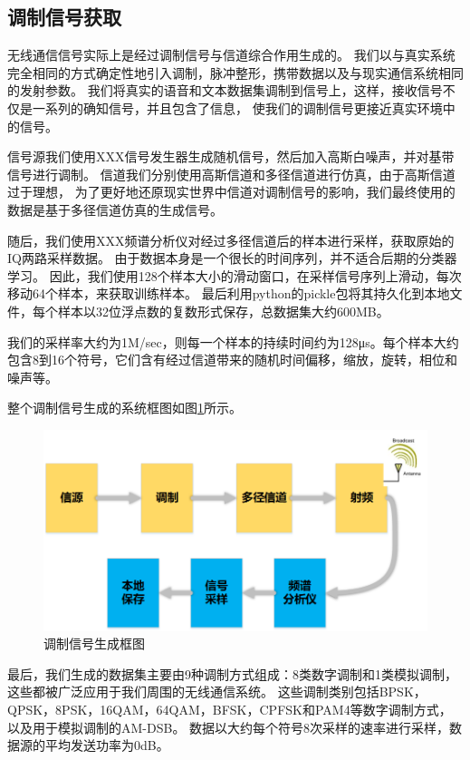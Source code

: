 \subsection{调制信号获取}

无线通信信号实际上是经过调制信号与信道综合作用生成的。
我们以与真实系统完全相同的方式确定性地引入调制，脉冲整形，携带数据以及与现实通信系统相同的发射参数。 
我们将真实的语音和文本数据集调制到信号上，这样，接收信号不仅是一系列的确知信号，并且包含了信息，
使我们的调制信号更接近真实环境中的信号。\par

信号源我们使用XXX信号发生器生成随机信号，然后加入高斯白噪声，并对基带信号进行调制。
信道我们分别使用高斯信道和多径信道进行仿真，由于高斯信道过于理想，
为了更好地还原现实世界中信道对调制信号的影响，我们最终使用的数据是基于多径信道仿真的生成信号。\par

随后，我们使用XXX频谱分析仪对经过多径信道后的样本进行采样，获取原始的IQ两路采样数据。
由于数据本身是一个很长的时间序列，并不适合后期的分类器学习。
因此，我们使用128个样本大小的滑动窗口，在采样信号序列上滑动，每次移动64个样本，来获取训练样本。
最后利用python的pickle包将其持久化到本地文件，每个样本以32位浮点数的复数形式保存，总数据集大约600MB。\par

我们的采样率大约为1M/sec，则每一个样本的持续时间约为128μs。每个样本大约包含8到16个符号，它们含有经过信道带来的随机时间偏移，缩放，旋转，相位和噪声等。\par
整个调制信号生成的系统框图如图\ref{sec:fig_3_1}所示。\par
\begin{figure}
	\centering
	\includegraphics[scale=0.6]{./figures/chapter_3/fig_3_1}
	\caption{调制信号生成框图}\label{sec:fig_3_1}
\end{figure}
最后，我们生成的数据集主要由9种调制方式组成：8类数字调制和1类模拟调制，这些都被广泛应用于我们周围的无线通信系统。
这些调制类别包括BPSK，QPSK，8PSK，16QAM，64QAM，BFSK，CPFSK和PAM4等数字调制方式，以及用于模拟调制的AM-DSB。 
数据以大约每个符号8次采样的速率进行采样，数据源的平均发送功率为0dB。\par


